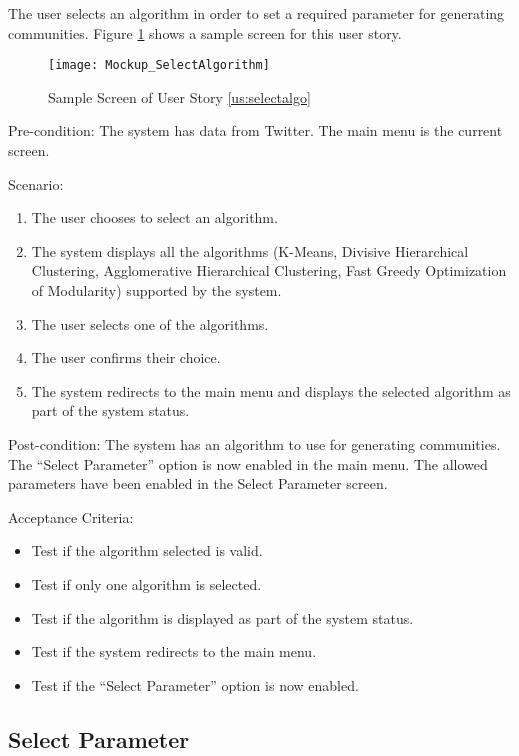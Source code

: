 The user selects an algorithm in order to set a required parameter for generating communities. Figure \ref{fig:selectalgo} shows a sample screen for this user story.


\begin{figure}[h]
	\centering
	\texttt{[image: Mockup\_SelectAlgorithm]}
	\caption{Sample Screen of User Story \ref{us:selectalgo}}
	\label{fig:selectalgo}	
\end{figure}


Pre-condition: The system has data from Twitter. The main menu is the current screen.




Scenario:
\begin{enumerate}
	\item The user chooses to select an algorithm.
	\item The system displays all the algorithms (K-Means, Divisive Hierarchical Clustering, Agglomerative Hierarchical Clustering, Fast Greedy Optimization of Modularity) supported by the system.
	\item The user selects one of the algorithms.
	\item The user confirms their choice.
	\item The system redirects to the main menu and displays the selected algorithm as part of the system status.
\end{enumerate}




Post-condition: The system has an algorithm to use for generating communities. The ``Select Parameter'' option
is now enabled in the main menu. The allowed parameters have been enabled in the Select Parameter screen.




Acceptance Criteria:
\begin{itemize}
	\item Test if the algorithm selected is valid.
	\item Test if only one algorithm is selected.
	\item Test if the algorithm is displayed as part of the system status.
	\item Test if the system redirects to the main menu.
	\item Test if the ``Select Parameter'' option is now enabled.
\end{itemize}




\subsection{Select Parameter}
\label{us:selectparam}




